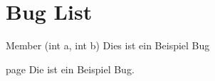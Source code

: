 \chapter{Bug List}
\hypertarget{bug}{}\label{bug}

\begin{DoxyRefList}
\item[Member \doxylink{class_bruch_a13fc58380d9e596c1d9e8c71a99965d2}{Bruch\+::ggt} (int a, int b)]\label{bug__bug000001}%
%
Dies ist ein Beispiel Bug 
\item[page \doxylink{index}{New\+Tec Dokumentation} ]\label{bug__bug000002}%
%
Die ist ein Beispiel Bug.
\end{DoxyRefList}